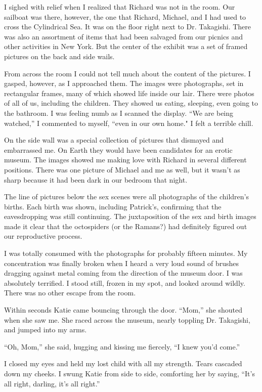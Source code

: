 \documentclass[]{article}
\begin{document}
I sighed with relief when I realized that Richard was not in the room.  Our sailboat was there, however, the one that Richard, Michael, and I had used to cross the Cylindrical Sea.  It was on the floor right next to Dr.  Takagishi.  There was also an assortment of items that had been salvaged from our picnics and other activities in New York.  But the center of the exhibit was a set of framed pictures on the back and side wails.

From across the room I could not tell much about the content of the pictures.  I gasped, however, as I approached them.  The images were photographs, set in rectangular frames, many of which showed life inside our lair.  There were photos of all of us, including the children.  They showed us eating, sleeping, even going to the bathroom.  I was feeling numb as I scanned the display.  “We are being watched,” I commented to myself, “even in our own home."  I felt a terrible chill.

On the side wall was a special collection of pictures that dismayed and embarrassed me.  On Earth they would have been candidates for an erotic museum.  The images showed me making love with Richard in several different positions.  There was one picture of Michael and me as well, but it wasn’t as sharp because it had been dark in our bedroom that night.

The line of pictures below the sex scenes were all photographs of the children’s births.  Each birth was shown, including Patrick’s, confirming that the eavesdropping was still continuing.  The juxtaposition of the sex and birth images made it clear that the octospiders (or the Ramans?) had definitely figured out our reproductive process.

I was totally consumed with the photographs for probably fifteen minutes.  My concentration was finally broken when I heard a very loud sound of brushes dragging against metal coming from the direction of the museum door.  I was absolutely terrified.  I stood still, frozen in my spot, and looked around wildly.  There was no other escape from the room.

Within seconds Katie came bouncing through the door.  “Mom,” she shouted when she saw me.  She raced across the museum, nearly toppling Dr.  Takagishi, and jumped into my arms.

“Oh, Mom,” she said, hugging and kissing me fiercely, “I knew you’d come.”

I closed my eyes and held my lost child with all my strength.  Tears cascaded down my cheeks.  I swung Katie from side to side, comforting her by saying, “It’s all right, darling, it’s all right.”
\end{document}
